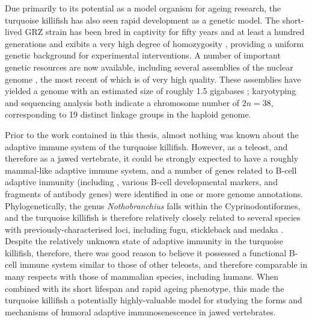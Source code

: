 Due primarily to its potential as a model organism for ageing research, the turquoise killifish has also seen rapid development as a genetic model. The short-lived GRZ strain has been bred in captivity for fifty years and at least a hundred generations \parencite{terzibasi2007review} and exibits a very high degree of homozygosity \parencite{kirschner2012map,reichwald2009genome,valenzano2009map}, providing a uniform genetic background for experimental interventions. A number of important genetic resources are now available, including several assemblies of the nuclear genome \parencite{reichwald2015genome,valenzano2015genome,willemsen2019popgen}, the most recent of which \parencite{willemsen2019popgen} is of very high quality. These assemblies have yielded a genome with an estimated size of roughly 1.5 gigabases \parencite{willemsen2019popgen};
karyotyping \parencite{reichwald2009genome} and sequencing analysis \parencite{reichwald2015genome} both indicate a chromosome number of $2n = 38$, corresponding to 19 distinct linkage groups in the haploid genome.

Prior to the work contained in this thesis, almost nothing was known about the adaptive immune system of the turquoise killifish. However, as a teleost, and therefore as a jawed vertebrate, it could be strongly expected to have a roughly mammal-like adaptive immune system, and a number of genes related to B-cell adaptive immunity (including , various B-cell developmental markers, and fragments of antibody genes) were identified in one or more genome annotations. Phylogenetically, the genus \textit{Nothobranchius} falls within the Cyprinodontiformes, and the turquoise killifish is therefore relatively closely related to several species with previously-characterised \igh{} loci, including fugu, stickleback and medaka \parencite{terzibasi2007review,hughes2018teleostphylo}. Despite the relatively unknown state of adaptive immunity in the turquoise killifish, therefore, there was good reason to believe it possessed a functional B-cell immune system similar to those of other teleosts, and therefore comparable in many respects with those of mammalian species, including humans. When combined with its short lifespan and rapid ageing phenotype, this made the turquoise killifish a potentially highly-valuable model for studying the forms and mechanisms of humoral adaptive immunosenescence in jawed vertebrates. %

